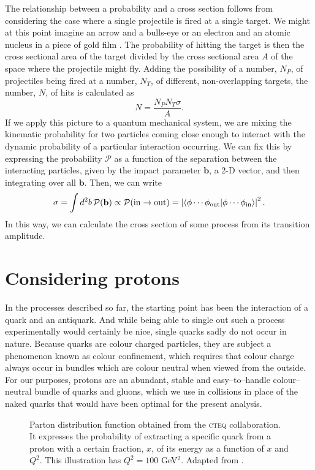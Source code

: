 The relationship between a probability and a cross section follows from considering the case where a single projectile is fired at a single target. We might at this point imagine an arrow and a bulls-eye or an electron and an atomic nucleus in a piece of gold film \cite{rutherford}. The probability of hitting the target is then the cross sectional area of the target divided by the cross sectional area $A$ of the space where the projectile might fly. Adding the possibility of a number, $N_P$, of projectiles being fired at a number, $N_T$, of different, non-overlapping targets, the number, $N$, of hits is calculated as
\[N=\frac{N_P N_T \sigma}{A}.\]
If we apply this picture to a quantum mechanical system, we are mixing the kinematic probability for two particles coming close enough to interact with the dynamic probability of a particular interaction occurring. We can fix this by expressing the probability $\mathcal P$ as a function of the separation between the interacting particles, given by the impact parameter $\mathbf b$, a 2-D vector, and then integrating over all $\mathbf b$. Then, we can write
\[\sigma=\int d^2b\,\mathcal P(\mathbf b)\propto\mathcal P(\text{in}\rightarrow\text{out})=\left|\left\langle\phi\cdots\phi_\text{out}\middle|\phi\cdots\phi_\text{in}\right\rangle\right|^2.\]
In this way, we can calculate the cross section of some process from its transition amplitude.

\section{Considering protons \label{sec.pdfth}}
In the processes described so far, the starting point has been the interaction of a quark and an antiquark. And while being able to single out such a process experimentally would certainly be nice, single quarks sadly do not occur in nature. Because quarks are colour charged particles, they are subject a phenomenon known as colour confinement, which requires that colour charge always occur in bundles which are colour neutral when viewed from the outside. For our purposes, protons are an abundant, stable and easy--to--handle colour--neutral bundle of quarks and gluons, which we use in collisions in place of the naked quarks that would have been optimal for the present analysis.

\begin{figure}[htp]
\begin{minipage}[b]{.69\textwidth}
\begin{infilsf} 
\tiny 

\end{infilsf}
\end{minipage}
\hfill\begin{minipage}[b]{.3\textwidth}
\caption{Parton distribution function obtained from the \textsc{cteq} collaboration. It expresses the probability of extracting a specific quark from a proton with a certain fraction, $x$, of its energy as a function of $x$ and $Q^2$. This illustration has $Q^2 = 100$ GeV$^2$. Adapted from \cite{durpdf}.\label{pdff}}
\end{minipage}
\end{figure}

